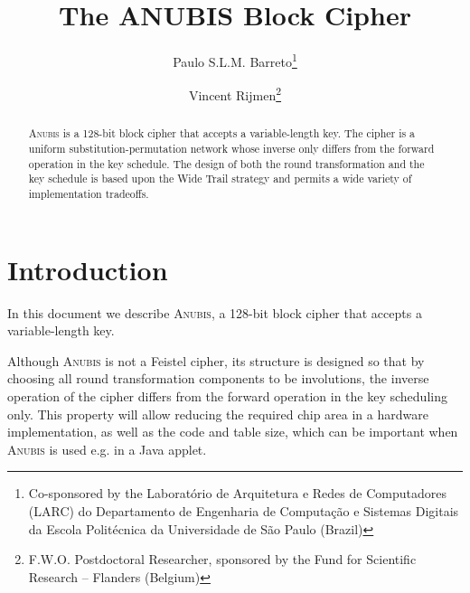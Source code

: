 \documentclass{llncs}
\begin{document}
\pagestyle{plain}

\title{The {A\normalsize NUBIS} Block Cipher}

\author{Paulo S.L.M. Barreto\thanks{Co-sponsored by the
Laborat\'{o}rio de Arquitetura e Redes de Computadores (LARC) do
Departamento de Engenharia de Computa\c{c}\~{a}o e Sistemas Digitais da
Escola Polit\'{e}cnica da Universidade de S\~{a}o Paulo (Brazil)}
\and Vincent Rijmen\thanks{F.W.O.
Postdoctoral Researcher, sponsored by the Fund for Scientific
Research -- Flanders (Belgium)}}


\maketitle

\begin{abstract}
\textsc{Anubis} is a 128-bit block cipher that accepts a
variable-length key. The cipher is a uniform
substitution-permutation network whose inverse only differs from
the forward operation in the key schedule. The design of both the
round transformation and the key schedule is based upon the Wide
Trail strategy and permits a wide variety of implementation
tradeoffs.
\end{abstract}

\section{Introduction}

In this document we describe \textsc{Anubis}, a 128-bit block
cipher that accepts a variable-length key.

Although \textsc{Anubis} is not a Feistel cipher, its structure is
designed so that by choosing all round transformation components
to be involutions, the inverse operation of the cipher differs
from the forward operation in the key scheduling only. This
property will allow reducing the required chip area in a hardware
implementation, as well as the code and table size, which can be
important when \textsc{Anubis} is used e.g. in a Java applet.
\end{document}
